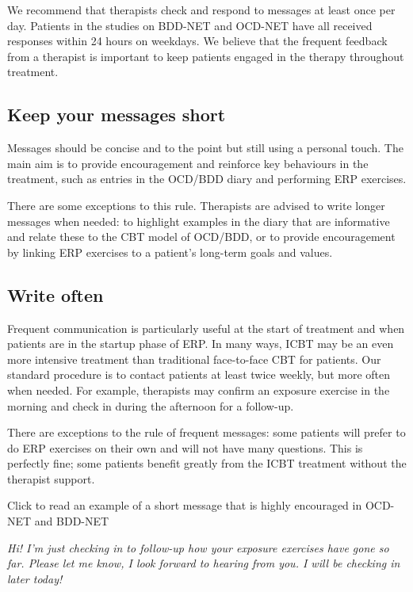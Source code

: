 \documentclass[]{book}
\begin{document}
We recommend that therapists check and respond to messages at least once per day. Patients in the studies on BDD-NET and OCD-NET have all received responses within 24 hours on weekdays. We believe that the frequent feedback from a therapist is important to keep patients engaged in the therapy throughout treatment.

\hypertarget{keep-your-messages-short}{%
\subsection{Keep your messages short}\label{keep-your-messages-short}}

Messages should be concise and to the point but still using a personal touch. The main aim is to provide encouragement and reinforce key behaviours in the treatment, such as entries in the OCD/BDD diary and performing ERP exercises.

There are some exceptions to this rule. Therapists are advised to write longer messages when needed: to highlight examples in the diary that are informative and relate these to the CBT model of OCD/BDD, or to provide encouragement by linking ERP exercises to a patient's long-term goals and values.

\hypertarget{write-often}{%
\subsection{Write often}\label{write-often}}

Frequent communication is particularly useful at the start of treatment and when patients are in the startup phase of ERP. In many ways, ICBT may be an even more intensive treatment than traditional face-to-face CBT for patients. Our standard procedure is to contact patients at least twice weekly, but more often when needed. For example, therapists may confirm an exposure exercise in the morning and check in during the afternoon for a follow-up.

There are exceptions to the rule of frequent messages: some patients will prefer to do ERP exercises on their own and will not have many questions. This is perfectly fine; some patients benefit greatly from the ICBT treatment without the therapist support.

 Click to read an example of a short message that is highly encouraged in OCD-NET and BDD-NET

\emph{Hi! I'm just checking in to follow-up how your exposure exercises have gone so far. Please let me know, I look forward to hearing from you. I will be checking in later today!}
\end{document}
